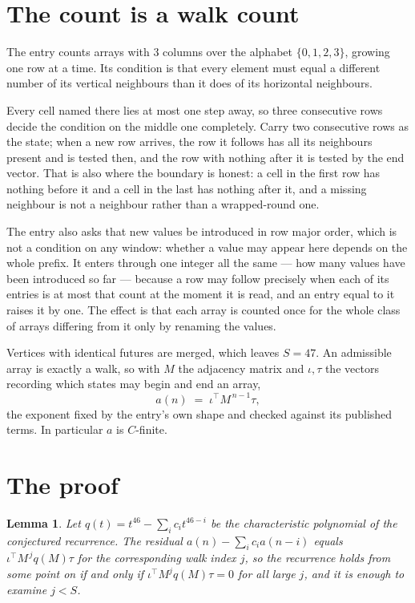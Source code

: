 \documentclass[11pt,a4paper]{article}
\theoremstyle{plain}
\newtheorem{lemma}[theorem]{Lemma}
\theoremstyle{definition}
\begin{document}
\section{The count is a walk count}

The entry counts arrays with $3$ columns over the alphabet $\{0,1,2,3\}$, growing one row at a time. Its condition is that every element must equal a different number of its vertical neighbours than it does of its horizontal neighbours.

Every cell named there lies at most one step away, so three consecutive rows decide the condition on the middle one completely. Carry two consecutive rows as the state; when a new row arrives, the row it follows has all its neighbours present and is tested then, and the row with nothing after it is tested by the end vector. That is also where the boundary is honest: a cell in the first row has nothing before it and a cell in the last has nothing after it, and a missing neighbour is not a neighbour rather than a wrapped-round one.

The entry also asks that new values be introduced in row major order, which is not a condition on any window: whether a value may appear here depends on the whole prefix. It enters through one integer all the same --- how many values have been introduced so far --- because a row may follow precisely when each of its entries is at most that count at the moment it is read, and an entry equal to it raises it by one. The effect is that each array is counted once for the whole class of arrays differing from it only by renaming the values.

Vertices with identical futures are merged, which leaves $S=47$. An admissible array is exactly a walk, so with $M$ the adjacency matrix and $\iota,\tau$ the vectors recording which states may begin and end an array,
\[
a(n)\;=\;\iota^{\!\top}M^{\,n-1}\tau ,
\]
the exponent fixed by the entry's own shape and checked against its published terms. In
particular $a$ is $C$-finite.

\section{The proof}

\begin{lemma}\label{lem:crit}
Let $q(t)=t^{46}-\sum_i c_it^{46-i}$ be the characteristic polynomial of the
conjectured recurrence. The residual $a(n)-\sum_ic_ia(n-i)$ equals
$\iota^{\!\top}M^{\,j}q(M)\tau$ for the corresponding walk index $j$, so the recurrence
holds from some point on if and only if $\iota^{\!\top}M^{j}q(M)\tau=0$ for all large $j$,
and it is enough to examine $j<S$.
\end{lemma}
\end{document}
